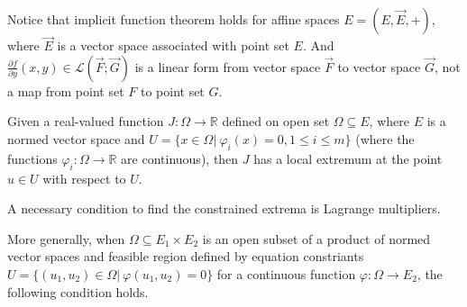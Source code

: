 \documentclass[a4paper]{report}
\begin{document}
Notice that implicit function theorem holds for affine spaces $E=(E,\vec E,+)$, where $\vec E$ is a vector space associated with point set $E$. And $\frac{\partial f}{\partial y}(x,y)\in \mathcal L (\vec F;\vec G)$ is a linear form from vector space $\vec F$ to vector space $\vec G$, not a map from point set $F$ to point set $G$.

Given a real-valued function $J:\Omega\to\mathbb R$ defined on open set $\Omega\subseteq E$, where $E$ is a normed vector space and $U=\{x\in\Omega |\ \varphi_i(x)=0, 1\leq i\leq m\}$ (where the functions $\varphi_i:\Omega\to\mathbb R$ are continuous), then $J$ has a local extremum at the point $u\in U$ with respect to $U$.

A necessary condition to find the constrained extrema is Lagrange multipliers.

More generally, when $\Omega\subseteq E_1\times E_2$ is an open subset of a product of normed vector spaces and feasible region defined by equation constriants $U=\{(u_1,u_2)\in\Omega |\  \varphi(u_1,u_2)=0\}$ for a continuous function $\varphi:\Omega\to E_2$, the following condition holds.
\end{document}

